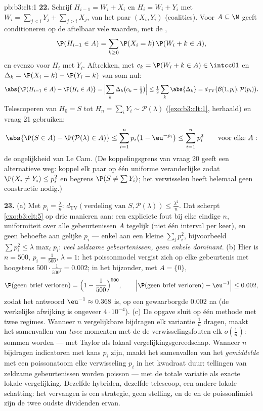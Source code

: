 \begin{solution}{pb:b3:clt:1}
\textbf{22.} Schrijf $H_{i-1} = W_i + X_i$ en $H_i = W_i +
Y_i$ met $W_i = \sum_{j<i}Y_j + \sum_{j>i}X_j$,
 van het paar $(X_i, Y_i)$ (coalities). Voor $A
\subseteq \N$ geeft conditioneren op de aftelbaar vele
waarden, met de ,
\[
\P(H_{i-1} \in A) = \sum_{k\geq0}\P(X_i = k)\,\P(W_i + k
\in A),
\]
en evenzo voor $H_i$ met $Y_i$. Aftrekken, met $c_k =
\P(W_i + k \in A) \in \intcc01$ en $\Delta_k = \P(X_i = k)
- \P(Y_i = k)$ van som nul:
\[
\abs{\P(H_{i-1} \in A) - \P(H_i \in A)} =
\Bigl|\sum_k\Delta_k\bigl(c_k - \tfrac12\bigr)\Bigr| \leq
\tfrac12\sum_k\abs{\Delta_k} =
d_{\mathrm{TV}}\bigl(\mathcal B(1, p_i), \mathcal
P(p_i)\bigr) .
\]
Telescoperen van $H_0 = S$ tot $H_n = \sum_iY_i \sim
\mathcal P(\lambda)$ (\cref{exo:b3:clt:1}, herhaald) en
vraag 21 gebruiken:
\[
\abs{\P(S \in A) - \P(\mathcal P(\lambda) \in A)} \leq
\sum_{i=1}^np_i\bigl(1 - \eu^{-p_i}\bigr) \leq
\sum_{i=1}^np_i^2
\qquad\text{voor elke } A :
\]
de ongelijkheid van Le Cam. (De koppelingsgrens van vraag
20 geeft een alternatieve weg: koppel elk paar op één
uniforme veranderlijke zodat $\P(X_i \neq Y_i) \leq p_i^2$
en begrens $\P(S \neq \sum Y_i)$; het verwisselen heeft
helemaal geen constructie nodig.)

\textbf{23.} (a) Met $p_i = \frac\lambda n$:
$d_{\mathrm{TV}}(\text{verdeling van }S, \mathcal
P(\lambda)) \leq \frac{\lambda^2}n$. Dat scherpt
\cref{exo:b3:clt:5} op drie manieren aan: een expliciete
fout bij elke eindige $n$, uniformiteit over alle
gebeurtenissen $A$ tegelijk (niet één interval per keer), en
geen behoefte aan gelijke $p_i$ --- enkel aan een kleine
$\sum_ip_i^2$, bijvoorbeeld $\sum p_i^2 \leq
\lambda\max_ip_i$: \emph{veel zeldzame gebeurtenissen, geen
enkele dominant}. (b) Hier is $n = 500$, $p_i =
\frac1{500}$, $\lambda = 1$: het poissonmodel vergist zich
op elke gebeurtenis met hoogstens $500\cdot\frac1{500^2} =
0.002$; in het bijzonder, met $A = \{0\}$,
\[
\P(\text{geen brief verloren}) = \Bigl(1 -
\frac1{500}\Bigr)^{500},
\qquad
\Bigl|\P(\text{geen brief verloren}) - \eu^{-1}\Bigr| \leq
0.002,
\]
zodat het antwoord $\eu^{-1} \approx 0.368$ is, op een
gewaarborgde $0.002$ na (de werkelijke afwijking is
ongeveer $4\cdot10^{-4}$). (c) De opgave sluit op één
methode met twee regimes. Wanneer $n$ vergelijkbare
bijdragen elk variantie $\frac1n$ dragen, maakt het
samenvallen van \emph{twee} momenten met de  de
verwisselingsfouten elk $o(\frac1n)$: sommen worden
 --- met Taylor als lokaal vergelijkingsgereedschap.
Wanneer $n$ bijdragen indicatoren met kans $p_i$ zijn, maakt
het samenvallen van het \emph{gemiddelde} met een
poissonatoom elke verwisseling $p_i$ in het kwadraat duur:
tellingen van zeldzame gebeurtenissen worden poisson --- met
de totale variatie als exacte lokale vergelijking. Dezelfde
hybriden, dezelfde telescoop, een andere lokale schatting:
het vervangen is een strategie, geen stelling, en de
 en de poissonlimiet zijn de twee oudste
dividenden ervan.


\end{solution}
